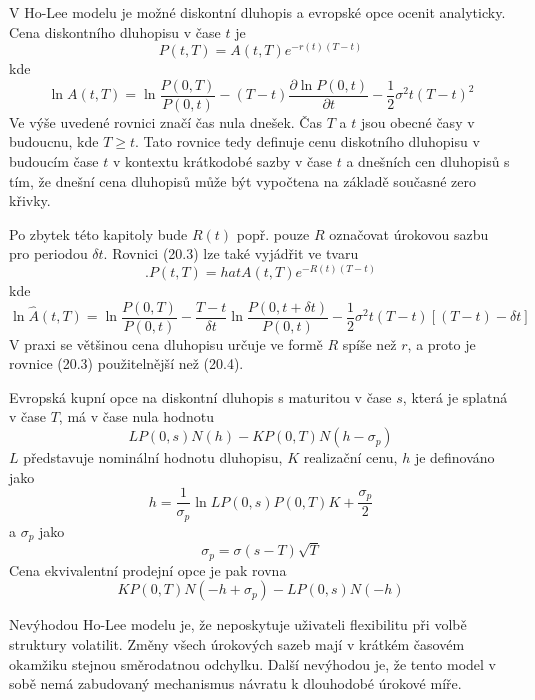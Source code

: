 \documentclass[a4paper]{book}
\begin{document}
V Ho-Lee modelu je možné diskontní dluhopis a evropské opce ocenit analyticky. Cena diskontního dluhopisu v čase $t$ je
\begin{equation}
P(t,T)=A(t,T)e^{-r(t)(T-t)}
\end{equation}
kde
\begin{equation*}
\ln A(t,T) = \ln \frac{P(0,T)}{P(0,t)}-(T-t)\frac{\partial \ln P(0,t)}{\partial t}-\frac{1}{2}\sigma^2t(T-t)^2
\end{equation*}
Ve výše uvedené rovnici značí čas nula dnešek. Čas $T$ a $t$ jsou obecné časy v budoucnu, kde $T \ge t$. Tato rovnice tedy definuje cenu diskotního dluhopisu v budoucím čase $t$ v kontextu krátkodobé sazby v čase $t$ a dnešních cen dluhopisů s tím, že dnešní cena dluhopisů může být vypočtena na základě současné zero křivky.

Po zbytek této kapitoly bude $R(t)$ popř. pouze $R$ označovat úrokovou sazbu pro periodou $\delta t$. Rovnici (20.3) lze také vyjádřit ve tvaru
\begin{equation}.
P(t,T)= hat{A}(t,T)e^{-R(t)(T-t)}
\end{equation}
kde
\begin{equation*}
\ln \hat{A}(t,T)=\ln \frac{P(0,T)}{P(0,t)}-\frac{T-t}{\delta t}\ln \frac{P(0,t+\delta t)}{P(0,t)}-\frac{1}{2}\sigma^2 t(T-t)[(T-t)-\delta t]
\end{equation*}
V praxi se většinou cena dluhopisu určuje ve formě $R$ spíše než $r$, a proto je rovnice (20.3) použitelnější než (20.4).

Evropská kupní opce na diskontní dluhopis s maturitou v čase $s$, která je splatná v čase $T$, má v čase nula hodnotu
\begin{equation*}
LP(0,s)N(h) - KP(0,T)N(h-\sigma_p)
\end{equation*}
$L$ představuje nominální hodnotu dluhopisu, $K$ realizační cenu, $h$ je definováno jako
\begin{equation*}
h = \frac{1}{\sigma_p}\ln{LP(0,s)}{P(0,T)K}+\frac{\sigma_p}{2}
\end{equation*}
a $\sigma_p$ jako
\begin{equation*}
\sigma_p = \sigma(s-T)\sqrt{T}
\end{equation*}
Cena ekvivalentní prodejní opce je pak rovna
\begin{equation*}
KP(0,T)N(-h+\sigma_p)-LP(0,s)N(-h)
\end{equation*}

Nevýhodou Ho-Lee modelu je, že neposkytuje uživateli flexibilitu při volbě struktury volatilit. Změny všech úrokových sazeb mají v krátkém časovém okamžiku stejnou směrodatnou odchylku. Další nevýhodou je, že tento model v sobě nemá zabudovaný mechanismus návratu k dlouhodobé úrokové míře.
\end{document}
